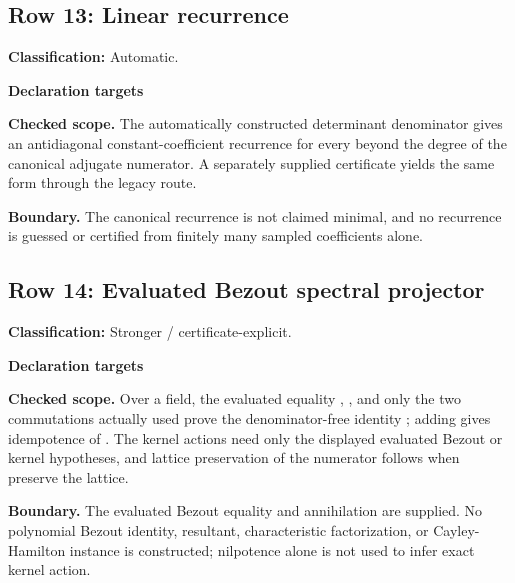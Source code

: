 \subsection{Row 13: Linear recurrence}
\label{row:13}
\textbf{Classification:} Automatic.
\par\smallskip\textbf{Declaration targets}\par
{\small\noindent{}\par}
{\small\noindent{}\par}
\smallskip\textbf{Checked scope.} The automatically constructed determinant denominator gives an antidiagonal constant-coefficient recurrence for every  beyond the degree of the canonical adjugate numerator. A separately supplied  certificate yields the same form through the legacy route.
\par\smallskip\textbf{Boundary.} The canonical recurrence is not claimed minimal, and no recurrence is guessed or certified from finitely many sampled coefficients alone.
\medskip
{}
\subsection{Row 14: Evaluated Bezout spectral projector}
\label{row:14}
\textbf{Classification:} Stronger / certificate-explicit.
\par\smallskip\textbf{Declaration targets}\par
{\small\noindent{}\par}
{\small\noindent{}\par}
{\small\noindent{}\par}
{\small\noindent{}\par}
{\small\noindent{}\par}
{\small\noindent{}\par}
{\small\noindent{}\par}
{\small\noindent{}\par}
{\small\noindent{}\par}
\smallskip\textbf{Checked scope.} Over a field, the evaluated equality , , and only the two commutations actually used prove the denominator-free identity ; adding  gives idempotence of . The kernel actions need only the displayed evaluated Bezout or kernel hypotheses, and lattice preservation of the numerator follows when  preserve the lattice.
\par\smallskip\textbf{Boundary.} The evaluated Bezout equality and annihilation are supplied. No polynomial Bezout identity, resultant, characteristic factorization, or Cayley-Hamilton instance is constructed; nilpotence alone is not used to infer exact kernel action.
\medskip
{}
